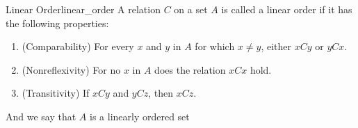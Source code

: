 \begin{definition}
{Linear Order}{linear_order}
A relation \(C\) on a set \(A\) is called a linear order if it has the following properties:
\begin{enumerate}
    \item (Comparability) For every \(x\) and \(y\) in \(A\) for which \(x \neq y\), either \(x C y\) or \(y C x\).
    \item (Nonreflexivity) For no \(x\) in \(A\) does the relation \(x C x\) hold.
    \item (Transitivity) If \(x C y\) and \(y C z\), then \(x C z\).
\end{enumerate}
And we say that \( A \) is a linearly ordered set
\end{definition}

